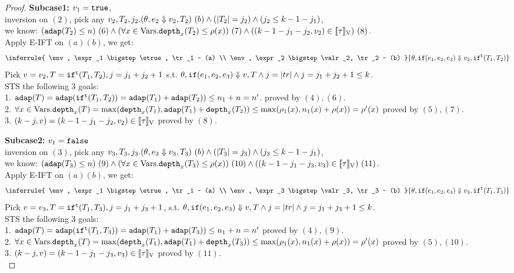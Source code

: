 \documentclass[a4paper,11pt]{article}
\theoremstyle{definition}
\begin{document}
\begin{proof}
{\bf Subcase1:} $v_1 = \mathtt{true}$, \\
%
inversion on $(2)$, pick any $v_2, T_2, j_2. (\theta, e_2 \mathrel{\Downarrow} v_2, T_2) ~ (b) \land (|T_2| = j_2) \land (j_2 \leq k-1-j_1)$,\\
%
we know: $(\mathtt{adap}(T_2) \leq n)~(6) \land (\forall x \in \mbox{Vars}. \mathtt{depth}_{x}(T_2) \leq \rho(x))~(7) \land ((k-1 - j_1-j_2, v_2) \in [\![ \tau ]\!]_{\text{V}})~(8)$.\\
%
Apply E-IFT on $(a) (b)$, we get:
\[
  \inferrule{
    \env, \expr_1 \bigstep \etrue, \tr_1 ~ (a) \\
    \env, \expr_2 \bigstep \valr_2, \tr_2 ~ (b)
  }{
    \env, \eif(\expr_1, \expr_2, \expr_3) \bigstep \valr_2, \trift(\tr_1, \tr_2)
  }
\]
Pick $v = v_2, T = \mathtt{if}^{\mathtt{t}}(T_1, T_2), j =j_1+ j_2+1$ s.t. $
\theta, \mathtt{if}(e_1, e_2, e_3) \mathrel{\Downarrow} v, T \land j =
|tr| \land j = j_1 + j_2+1 \leq k$.\\
 STS the following 3 goals:\\
%
1. $\mathtt{adap}(T) = \mathtt{adap}(\mathtt{if}^{\mathtt{t}}(T_1, T_2)) = \mathtt{adap}(T_1) +
\mathtt{adap}(T_2)) \leq n_1 + n = n'$. proved by $(4),(6)$.\\
%
2. $\forall x \in \mbox{Vars} . \mathtt{depth}_{x}(T) = \max(\mathtt{depth}_{x}(T_1), \mathtt{adap}(T_1) +
\mathtt{depth}_{x}(T_2)) \leq \max(\rho_1(x), n_1(x) + \rho(x)) =
\rho'(x)  $ proved by $(5), (7)$.\\
%
3. $(k - j, v) = (k-1 -j_1- j_2, v_2) \in
[\![ \tau ]\!]_{\text{V}}$ proved by $(8)$.

{\bf Subcase2:} $v_1 = \mathtt{false}$\\
%
inversion on $(3)$, pick any $v_3, T_3, j_3. (\theta, e_3 \mathrel{\Downarrow} v_3, T_3) ~ (b) \land (|T_3| = j_3) \land (j_3 \leq k-1-j_1)$,\\
%
we know: $(\mathtt{adap}(T_3) \leq n) ~(9) \land (\forall x \in
\mbox{Vars}. \mathtt{depth}_{x}(T_3) \leq \rho(x))~(10) \land ((k -1-j_1- j_3, v_3) \in [\![ \tau ]\!]_{\text{V}})~(11)$.\\
%
Apply E-IFT on $(a) (b)$, we get:
\[
  \inferrule{
    \env, \expr_1 \bigstep \etrue, \tr_1 ~ (a) \\
    \env, \expr_3 \bigstep \valr_3, \tr_3 ~ (b)
  }{
    \env, \eif(\expr_1, \expr_2, \expr_3) \bigstep \valr_3, \trift(\tr_1, \tr_3)
  }
\]
Pick $v = v_3, T = \mathtt{if}^{\mathtt{t}}(T_1, T_3), j =j_1+ j_3+1$,  s.t. $
\theta, \mathtt{if}(e_1, e_2, e_3) \mathrel{\Downarrow} v, T \land j =
|tr| \land j = j_1 + j_3+1 \leq k$.\\
 STS the following 3 goals:\\
%
1. $\mathtt{adap}(T) = \mathtt{adap}(\mathtt{if}^{\mathtt{t}}(T_1, T_3)) = \mathtt{adap}(T_1) +
\mathtt{adap}(T_3)) \leq n_1 + n = n'$  proved by $(4),(9)$.\\
%
2. $\forall x \in \mbox{Vars}. \mathtt{depth}_{x}(T) = \max(\mathtt{depth}_{x}(T_1), \mathtt{adap}(T_1) +
\mathtt{depth}_{x}(T_3)) \leq \max(\rho_1(x), n_1(x) + \rho(x)) =
\rho'(x) $ proved by $(5),(10)$.\\
%
3. $(k - j, v) = (k -1 - j_1-j_3, v_3) \in
[\![ \tau ]\!]_{\text{V}} $ proved by $(11)$.\\




\end{proof}
\end{document}
